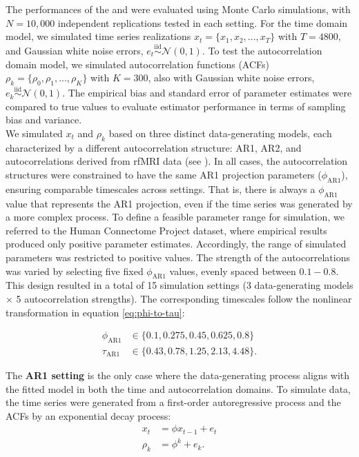 \documentclass[main.tex]{subfiles}
\begin{document}
The performances of the  and  were evaluated using Monte Carlo simulations, with $N = 10,000$ independent replications tested in each setting. For the time domain model, we simulated time series realizations $x_t = \{x_1, x_2, ..., x_T\}$ with $T=4800$, and Gaussian white noise errors, $e_t \overset{\text{iid}}{\sim} \mathcal{N}(0, 1)$. To test the autocorrelation domain model, we simulated autocorrelation functions (ACFs) $\rho_k = \{\rho_0, \rho_1, ..., \rho_K\}$ with $K=300$, also with Gaussian white noise errors, $e_k \overset{\text{iid}}{\sim} \mathcal{N}(0, 1)$. The empirical bias and standard error of parameter estimates were compared to true values to evaluate estimator performance in terms of sampling bias and variance.\\

We simulated $x_t$ and $\rho_k$ based on three distinct data-generating models, each characterized by a different autocorrelation structure: AR1, AR2, and autocorrelations derived from rfMRI data (see ). In all cases, the autocorrelation structures were constrained to have the same AR1 projection parameters ($\phi_\text{AR1}$), ensuring comparable timescales across settings. That is, there is always a $\phi_\text{AR1}$ value that represents the AR1 projection, even if the time series was generated by a more complex process. To define a feasible parameter range for simulation, we referred to the Human Connectome Project dataset, where empirical results produced only positive parameter estimates. Accordingly, the range of simulated parameters was restricted to positive values. The strength of the autocorrelations was varied by selecting five fixed $\phi_\text{AR1}$ values, evenly spaced between $0.1 - 0.8$. This design resulted in a total of 15 simulation settings (3 data-generating models $\times$ 5 autocorrelation strengths). The corresponding timescales follow the nonlinear transformation in equation \eqref{eq:phi-to-tau}:

\begin{align}
    \phi_\text{AR1} &\in \{0.1, 0.275, 0.45, 0.625, 0.8\} \label{eq:tau-ar1}\\
    \tau_\text{AR1} &\in \{0.43, 0.78, 1.25, 2.13, 4.48\}.
\end{align}


The \textbf{AR1 setting} is the only case where the data-generating process aligns with the fitted model in both the time and autocorrelation domains. To simulate data, the time series were generated from a first-order autoregressive process and the ACFs by an exponential decay process:
\begin{align}
    x_t &= \phi x_{t-1} + e_t\\
    \rho_k &= \phi^k + e_k.
\end{align}
\end{document}
